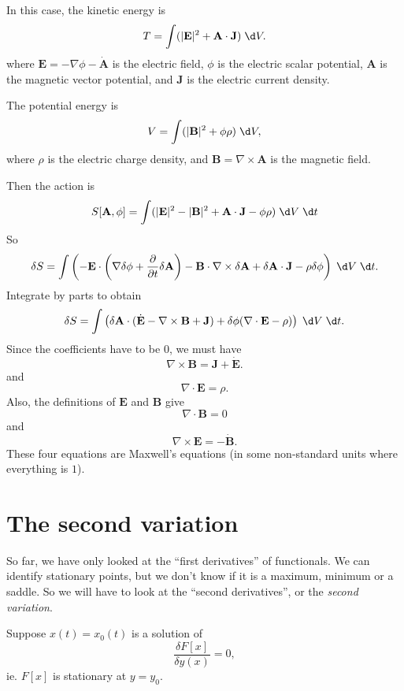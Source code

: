 \documentclass[a4paper]{article}
\begin{document}
\begin{eg}
  In this case, the kinetic energy is
  \[
    T = \int (|\mathbf{E}|^2 + \mathbf{A}\cdot \mathbf{J}) \;\d V.
  \]
  where $\mathbf{E} = -\nabla \phi - \dot{\mathbf{A}}$ is the electric field, $\phi$ is the electric scalar potential, $\mathbf{A}$ is the magnetic vector potential, and $\mathbf{J}$ is the electric current density.

  The potential energy is
  \[
    V = \int (|\mathbf{B}|^2 + \phi \rho)\;\d V,
  \]
  where $\rho$ is the electric charge density, and $\mathbf{B} = \nabla\times \mathbf{A}$ is the magnetic field.

  Then the action is
  \[
    S[\mathbf{A}, \phi] = \int (|\mathbf{E}|^2 - |\mathbf{B}|^2 + \mathbf{A}\cdot \mathbf{J} - \phi \rho)\;\d V\;\d t
  \]
  So
  \[
    \delta S = \int \left(-\mathbf{E}\cdot \left(\nabla \delta\phi + \frac{\partial}{\partial t} \delta \mathbf{A}\right) - \mathbf{B}\cdot \nabla \times \delta \mathbf{A} + \delta \mathbf{A}\cdot \mathbf{J} - \rho\delta\phi\right)\;\d V\;\d t.
  \]
  Integrate by parts to obtain
  \[
    \delta S = \int\left(\delta\mathbf{A}\cdot (\dot{\mathbf{E}} - \nabla\times \mathbf{B} + \mathbf{J}) + \delta \phi(\nabla\cdot \mathbf{E} - \rho)\right)\;\d V\;\d t.
  \]
  Since the coefficients have to be $0$, we must have
  \[
    \nabla \times \mathbf{B} = \mathbf{J} + \dot{\mathbf{E}}.
  \]
  and
  \[
    \nabla \cdot \mathbf{E} = \rho.
  \]
  Also, the definitions of $\mathbf{E}$ and $\mathbf{B}$ give
  \[
    \nabla\cdot \mathbf{B} = 0
  \]
  and
  \[
    \nabla \times \mathbf{E} = - \dot{\mathbf{B}}.
  \]
  These four equations are Maxwell's equations (in some non-standard units where everything is $1$).
\end{eg}
\section{The second variation}
So far, we have only looked at the ``first derivatives'' of functionals. We can identify stationary points, but we don't know if it is a maximum, minimum or a saddle. So we will have to look at the ``second derivatives'', or the \emph{second variation}.

Suppose $x(t) = x_0(t)$ is a solution of
\[
  \frac{\delta F[x]}{\delta y(x)} = 0,
\]
ie. $F[x]$ is stationary at $y = y_0$.
\end{document}
